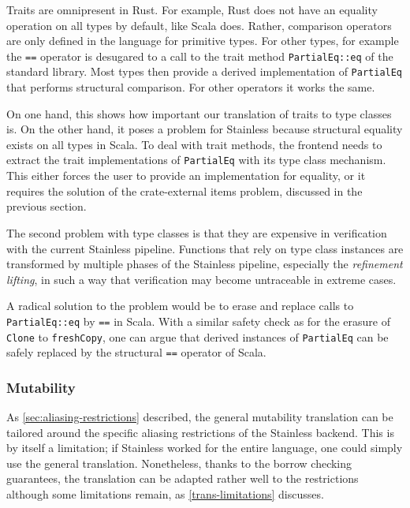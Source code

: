 Traits are omnipresent in Rust. For example, Rust does not have an equality
operation on all types by default, like Scala does. Rather, comparison operators
are only defined in the language for primitive types. For other types, for
example the \lstinline!==! operator is desugared to a call to the trait method
\lstinline!PartialEq::eq! of the standard library. Most types then provide a
derived implementation of \lstinline!PartialEq! that performs structural
comparison. For other operators it works the same.

On one hand, this shows how important our translation of traits to type classes
is. On the other hand, it poses a problem for Stainless because structural
equality exists on all types in Scala. To deal with trait methods, the frontend
needs to extract the trait implementations of \lstinline!PartialEq! with its
type class mechanism. This either forces the user to provide an implementation
for equality, or it requires the solution of the crate-external items problem,
discussed in the previous section.

The second problem with type classes is that they are expensive in verification
with the current Stainless pipeline. Functions that rely on type class instances
are transformed by multiple phases of the Stainless pipeline, especially the
\emph{refinement lifting}, in such a way that verification may become
untraceable in extreme cases.

A radical solution to the problem would be to erase and replace calls to
\lstinline!PartialEq::eq! by \lstinline!==! in Scala. With a similar safety
check as for the erasure of \lstinline!Clone! to \lstinline!freshCopy!, one can
argue that derived instances of \lstinline!PartialEq! can be safely replaced by
the structural \lstinline!==! operator of Scala.

\subsubsection{Mutability}

As \autoref{sec:aliasing-restrictions} described, the general mutability
translation can be tailored around the specific aliasing restrictions of the
Stainless backend. This is by itself a limitation; if Stainless worked for the
entire language, one could simply use the general translation. Nonetheless,
thanks to the borrow checking guarantees, the translation can be adapted rather
well to the restrictions although some limitations remain, as
\autoref{trans-limitations} discusses.

